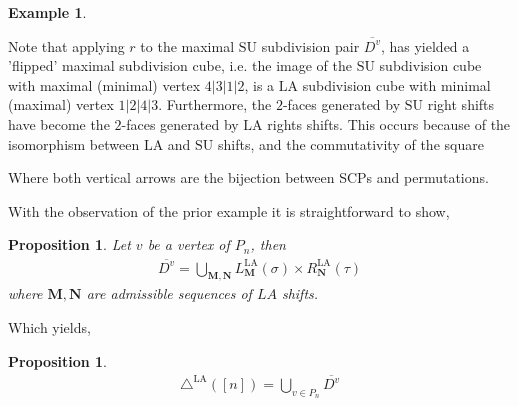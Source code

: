 \documentclass{amsart}
\newcommand{\red}{\color{red}} %
\newcommand{\Kurt}[1]{\todo[color=orange!30]{\rm #1 \\ \hfill --- K.}}
\newtheorem{proposition}[theorem]{Proposition}
\theoremstyle{definition}
\newtheorem{example}[theorem]{Example}
\newcommand{\SU}{\mathrm{SU}}
\newcommand{\LA}{\mathrm{LA}}
\newcommand{\LAD}{\triangle^{\mathrm{LA}}}
\newcommand{\maxsubdivpairsv}{\overline{D^v}}
\begin{document}
\begin{example}
\begin{center}
{
}
\end{center}
Note that applying $r$ to the maximal $\SU$ subdivision pair $\maxsubdivpairsv$, has yielded a 'flipped' maximal subdivision cube, i.e. the image of the $\SU$ subdivision cube with maximal (minimal) vertex $4|3|1|2$, is a $\LA$ subdivision cube with minimal (maximal) vertex $1|2|4|3$. 
Furthermore, the $2$-faces generated by $\SU$ right shifts have become the $2$-faces generated by $\LA$ rights shifts.
This occurs because of the isomorphism between $\LA$ and $\SU$ shifts, and the commutativity of the square 
\begin{center}
\end{center}
Where both vertical arrows are the bijection between SCPs and permutations. \Kurt{$rs \times rs$ also commutes with $rs$}
\end{example}

With the observation of the prior example it is straightforward to show,

\begin{proposition}
Let $v$ be a vertex of $P_n$, then
\begin{align*}
    \maxsubdivpairsv = \bigcup_{\mathbf{M},\mathbf{N}} L_\mathbf{M}^{\LA}(\sigma) \times R_{\mathbf{N}}^{\LA}(\tau)
\end{align*}
where $\mathbf{M},\mathbf{N}$ are admissible sequences of $LA$ shifts.
\end{proposition}

Which yields,
\begin{proposition}
\begin{align*}
    \LAD([n]) = \bigcup_{v \in P_n} \maxsubdivpairsv
\end{align*}
\end{proposition}
\end{document}
